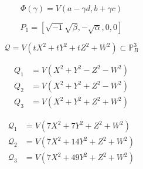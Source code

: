 \[
	\Phi(\gamma)=V(a-\gamma d, b+\gamma c)
\]


\[
	P_{1}=[\sqrt{-1} \sqrt{\beta},-\sqrt{\alpha}, 0,0]
\]

\[
	\mathscr{Q}=V\left(t X^{2}+t Y^{2}+t Z^{2}+W^{2}\right) \subset \mathbb{P}_{B}^{3}
\]


\[
\begin{aligned} Q_{1} &=V\left(X^{2}+Y^{2}-Z^{2}-W^{2}\right) \\ Q_{2} &=V\left(X^{2}+Y^{2}+Z^{2}-W^{2}\right) \\ Q_{3} &=V\left(X^{2}+Y^{2}+Z^{2}+W^{2}\right) \end{aligned}
\]

\[
\begin{aligned} \mathscr{Q}_{1} &=V\left(7 X^{2}+7 Y^{2}+Z^{2}+W^{2}\right) \\ \mathscr{Q}_{2} &=V\left(7 X^{2}+14 Y^{2}+Z^{2}+W^{2}\right) \\ \mathscr{Q}_{3} &=V\left(7 X^{2}+49 Y^{2}+Z^{2}+W^{2}\right) \end{aligned}
\]